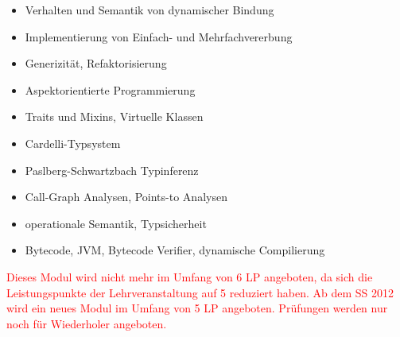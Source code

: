 \begin{module}
\begin{learningoutcomes}
\end{learningoutcomes}

\begin{content}
\begin{itemize}\item Verhalten und Semantik von dynamischer Bindung  \item Implementierung von Einfach- und Mehrfachvererbung  \item Generizität, Refaktorisierung  \item Aspektorientierte Programmierung  \item Traits und Mixins, Virtuelle Klassen  \item Cardelli-Typsystem  \item Paslberg-Schwartzbach Typinferenz  \item Call-Graph Analysen, Points-to Analysen  \item operationale Semantik, Typsicherheit  \item Bytecode, JVM, Bytecode Verifier, dynamische Compilierung  \end{itemize}
\end{content}

\begin{remarks}\textcolor{red}{Dieses Modul wird nicht mehr im Umfang von 6 LP angeboten, da sich die Leistungspunkte der Lehrveranstaltung auf 5 reduziert haben. Ab dem SS 2012 wird ein neues Modul im Umfang von 5 LP angeboten. Prüfungen werden nur noch für Wiederholer angeboten.}

\end{remarks}

\end{module}


